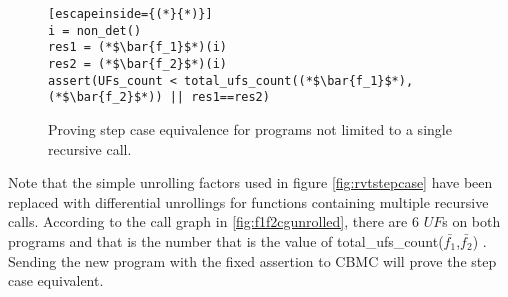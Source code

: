 \begin{figure} [h]
\begin{center}
\begin{minipage}{7 cm}
\begin{lstlisting}[escapeinside={(*}{*)}]
i = non_det()
res1 = (*$\bar{f_1}$*)(i)
res2 = (*$\bar{f_2}$*)(i)
assert(UFs_count < total_ufs_count((*$\bar{f_1}$*),(*$\bar{f_2}$*)) || res1==res2)
\end{lstlisting}
\end{minipage}
\caption{Proving step case equivalence for programs not limited to a single recursive call.}
\label{fig:rvtmrcstepcase}
\end{center}
\end{figure}
Note that the simple unrolling factors used in figure \ref{fig:rvtstepcase} have been replaced with differential unrollings for functions containing multiple recursive calls.
According to the call graph in \ref{fig:f1f2cgunrolled}, there are 6 $UF$s on both programs and that is the number that is the value of total\_ufs\_count($\bar{f_1}$,$\bar{f_2}$) . Sending the new program with the fixed assertion to CBMC will prove the step case equivalent.
